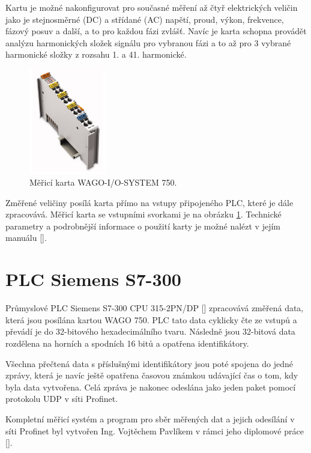 Kartu je možné nakonfigurovat pro současné měření až čtyř elektrických veličin jako je stejnosměrné (DC) a střídané (AC) napětí, proud, výkon, frekvence, fázový posuv a další, a to pro každou fázi zvlášť. Navíc je karta schopna provádět analýzu harmonických složek signálu pro vybranou fázi a to až pro 3 vybrané harmonické složky z rozsahu 1. a 41. harmonické. 

\begin{figure}[ht]
    \includegraphics[width=0.3\textwidth]{wago_obr}
    \caption{Měřicí karta WAGO-I/O-SYSTEM 750.}
    \label{wago_pic}
\end{figure}

Změřené veličiny posílá karta přímo na vstupy připojeného PLC, které je dále zpracovává. Měřicí karta se vstupními svorkami je na obrázku \ref{wago_pic}. Technické parametry a podrobnější informace o použití karty je možné nalézt v jejím manuálu [\cite{wago}].

\section{PLC Siemens S7-300}

Průmyslové PLC Siemens S7-300 CPU 315-2PN/DP [\cite{siemens_plc}] zpracovává změřená data, která jsou posílána kartou WAGO 750. PLC tato data cyklicky čte ze vstupů a převádí je do 32-bitového hexadecimálního tvaru. Následně jsou 32-bitová data rozdělena na horních a spodních 16 bitů a opatřena identifikátory. 

Všechna přečtená data s příslušnými identifikátory jsou poté spojena do jedné zprávy, která je navíc ještě opatřena časovou známkou udávající čas o tom, kdy byla data vytvořena. Celá zpráva je nakonec odeslána jako jeden paket pomocí protokolu UDP v síti Profinet.  

Kompletní měřicí systém a program pro sběr měřených dat a jejich odesílání v síti Profinet byl vytvořen Ing. Vojtěchem Pavlíkem v rámci jeho diplomové práce [\cite{vojtech_pavlik}]. 

